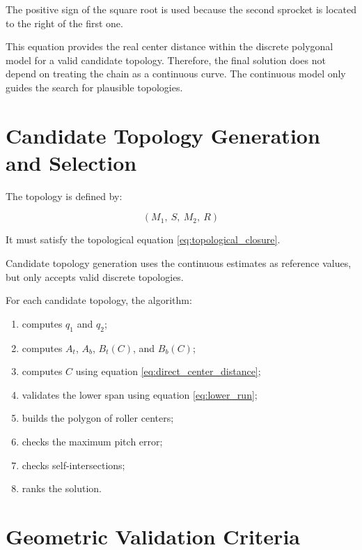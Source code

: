 \documentclass[12pt,a4paper]{article}
\begin{document}
The positive sign of the square root is used because the second sprocket is located to the right of the first one.

This equation provides the real center distance within the discrete polygonal model for a valid candidate topology. Therefore, the final solution does not depend on treating the chain as a continuous curve. The continuous model only guides the search for plausible topologies.

\section{Candidate Topology Generation and Selection}

The topology is defined by:

\begin{equation}
(M_1,\ S,\ M_2,\ R)
\end{equation}

It must satisfy the topological equation \eqref{eq:topological_closure}.

Candidate topology generation uses the continuous estimates as reference values, but only accepts valid discrete topologies.

For each candidate topology, the algorithm:

\begin{enumerate}
    \item computes $q_1$ and $q_2$;
    \item computes $A_t$, $A_b$, $B_t(C)$, and $B_b(C)$;
    \item computes $C$ using equation \eqref{eq:direct_center_distance};
    \item validates the lower span using equation \eqref{eq:lower_run};
    \item builds the polygon of roller centers;
    \item checks the maximum pitch error;
    \item checks self-intersections;
    \item ranks the solution.
\end{enumerate}

\section{Geometric Validation Criteria}
\end{document}
